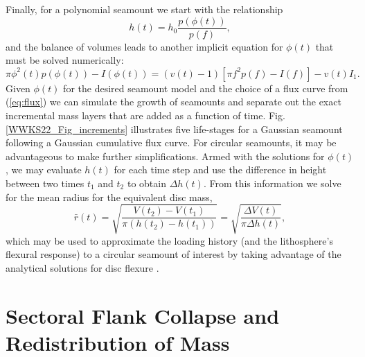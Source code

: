Finally, for a polynomial seamount we start with the relationship
\begin{equation*}
h(t) = h_0 \frac{p(\phi(t))}{p(f)},
\end{equation*}
and the balance of volumes leads to another implicit equation for $\phi(t)$ that must be solved numerically:
\begin{equation*}
	\pi \phi^2(t) p(\phi(t)) - I(\phi(t)) = (v(t)-1) \left [\pi f^2 p(f) - I(f) \right ] - v(t) I_1.
\end{equation*}
Given $\phi(t)$ for the desired seamount model and the choice of a flux curve from (\ref{eq:flux}) we
can simulate the growth of seamounts and separate out the exact incremental mass layers that are added as a
function of time.  Fig. \ref{WWKS22_Fig_increments} illustrates five life-stages for a Gaussian seamount following a
Gaussian cumulative flux curve.
For circular seamounts, it may be advantageous to make further simplifications.  Armed with the solutions
for $\phi(t)$, we may evaluate $h(t)$ for each time step and use the difference
in height between two times $t_1$ and $t_2$ to obtain $\Delta h(t)$.  From this information we solve for
the mean radius for the equivalent disc mass,
\begin{equation*}
\bar{r}(t) = \sqrt{\frac{V(t_2) - V(t_1)}{\pi \left( h(t_2) - h(t_1) \right)}} = \sqrt{\frac{\Delta V(t)}{\pi \Delta h(t)}},
\end{equation*}
which may be used to approximate the loading history (and the lithosphere's flexural response) to a circular seamount of interest
by taking advantage of the analytical solutions for disc flexure \citep{BS1969}.

\section{Sectoral Flank Collapse and Redistribution of Mass}

